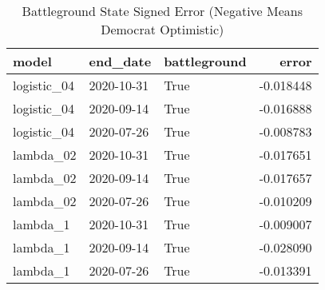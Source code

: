 \begin{table}
\centering
\caption{Battleground State Signed Error
(Negative Means Democrat Optimistic)}
\label{table:signed\_error\_battleground\_time\_series}
\begin{tabular}{lllr}
\toprule
       model &    end\_date &  battleground &     error \\
\midrule
 logistic\_04 &  2020-10-31 &          True & -0.018448 \\
 logistic\_04 &  2020-09-14 &          True & -0.016888 \\
 logistic\_04 &  2020-07-26 &          True & -0.008783 \\
   lambda\_02 &  2020-10-31 &          True & -0.017651 \\
   lambda\_02 &  2020-09-14 &          True & -0.017657 \\
   lambda\_02 &  2020-07-26 &          True & -0.010209 \\
    lambda\_1 &  2020-10-31 &          True & -0.009007 \\
    lambda\_1 &  2020-09-14 &          True & -0.028090 \\
    lambda\_1 &  2020-07-26 &          True & -0.013391 \\
\bottomrule
\end{tabular}
\end{table}

